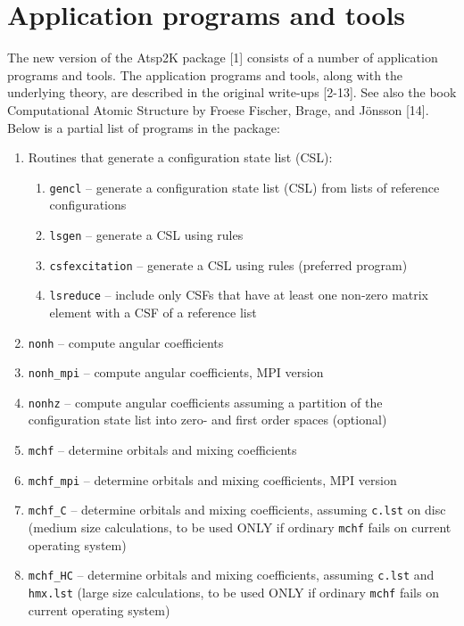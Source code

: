 \documentclass[fleqn,10pt]{book}
\begin{document}
\section{Application programs and tools}
The new version of the {\sc Atsp}2K package [1] consists of a number of application programs and tools. The application programs and tools, along with the underlying theory, are described in the original
write-ups [2-13]. See also the book Computational Atomic Structure by Froese Fischer, Brage, and J\"onsson [14].\medskip\\
Below is a partial list of programs in the package: 


\begin{enumerate}
\item Routines that generate a configuration state list (CSL):
\begin{enumerate}
\item {\tt gencl}       -- generate a configuration state list (CSL) 
from lists of reference configurations 
\item {\tt lsgen}     -- generate a CSL using rules
\item {\tt csfexcitation}     -- generate a CSL using rules (preferred program)
\item {\tt lsreduce}  -- include only CSFs that have at least one non-zero 
matrix element with a CSF of a reference list
\end{enumerate}

\item {\tt nonh}       -- compute angular coefficients
\item {\tt nonh\_mpi}       -- compute angular coefficients, MPI version 
\item {\tt nonhz}  -- compute angular coefficients assuming a partition of the configuration state list into zero- and first order spaces (optional)    

\item {\tt mchf}      -- determine orbitals and mixing coefficients
\item {\tt mchf\_mpi}      -- determine orbitals and mixing coefficients, MPI version
\item {\tt mchf\_C}      -- determine orbitals and mixing coefficients, assuming {\tt c.lst} on disc (medium size calculations, to be used ONLY if ordinary {\tt mchf} fails on current operating system) 

\item {\tt mchf\_HC}      -- determine orbitals and mixing coefficients, assuming {\tt c.lst} and {\tt hmx.lst} (large size calculations, to be used ONLY if ordinary {\tt mchf} fails on current operating system) 


\end{enumerate}
\end{document}
